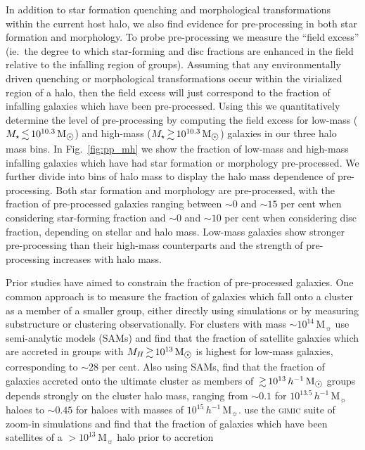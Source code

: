 \documentclass[a4paper,fleqn,usenatbib]{mnras}
\newcommand{\Msun}{\,\mathrm{M_{\sun}}}
\begin{document}
In addition to star formation quenching and morphological
transformations within the current host halo, we also find evidence
for pre-processing in both star formation and morphology.  To probe
pre-processing we measure the ``field excess'' (ie.\ the degree to
which star-forming and disc fractions are enhanced in the field
relative to the infalling region of groups).  Assuming that any
environmentally driven quenching or morphological transformations occur within the virialized region of a halo,
then the field excess will just correspond to the fraction of
infalling galaxies which have been pre-processed.  Using this we
quantitatively determine the level of pre-processing by computing the
field excess for low-mass ($M_\star \la
10^{10.3}\Msun$) and high-mass  ($M_\star \ga 10^{10.3}\Msun$)
galaxies in our three halo mass bins.  In Fig.~\ref{fig:pp_mh} we show
the fraction of low-mass and high-mass infalling galaxies which have
had star formation or morphology pre-processed.  We further divide into
bins of halo mass to display the halo mass dependence of
pre-processing.  Both star formation and morphology are pre-processed,
with the fraction of pre-processed galaxies ranging between $\sim\!0$
and $\sim\!15$ per cent when considering star-forming fraction and
$\sim\!0$ and $\sim\!10$ per cent when considering disc fraction,
depending on stellar and halo mass.  Low-mass
galaxies show stronger pre-processing than their high-mass
counterparts and the
strength of pre-processing increases with halo mass. 
\par
Prior studies have aimed to constrain the
fraction of pre-processed galaxies.  One common approach is to measure
the fraction of
galaxies which fall onto a cluster as a member of a smaller group,
either directly using simulations or by measuring substructure or
clustering observationally.  For clusters with mass $\sim
\!10^{14}\Msun$ \citet{delucia2012} use semi-analytic models (SAMs) and find
that the fraction of satellite galaxies which are accreted in groups
with $M_H \ga 10^{13}\Msun$ is highest for low-mass galaxies,
corresponding to $\sim\!28$ per cent.  Also using SAMs,
\citet{mcgee2009} find that the fraction of galaxies accreted onto the
ultimate cluster as members of $\ga 10^{13}\,h^{-1}\Msun$ groups depends
strongly on the cluster halo mass, ranging from $\sim\!0.1$ for
$10^{13.5}\,h^{-1}\Msun$ haloes to $\sim\!0.45$ for haloes with masses
of $10^{15}\,h^{-1}\Msun$.  \citet{bahe2013} use the \textsc{gimic}
suite of zoom-in simulations and find that the fraction of galaxies
which have been satellites of a $>\!10^{13}\Msun$ halo prior to accretion
\end{document}
